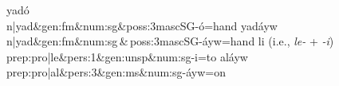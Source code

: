 \begin{description}
\begin{exe}
\ex \label{ex:prosuf-3ms}
{\selectfont \small
yad\'{o} \\
n|yad\&gen:fm\&num:sg\&poss:3mascSG-\'{o}=hand
}
\ex \label{ex:prosuf-3mpl}
{\selectfont \small
yad\'{a}yw \\
n|yad\&gen:fm\&num:sg\,\&\,poss:3mascSG-\'{a}yw=hand
}
\ex \label{ex:prep-pro-to}
{\selectfont \small
li \qquad \textrm{(i.e., \textit{le-} + \textit{-i})} \\
prep:pro|le\&pers:1\&gen:unsp\&num:sg-i=to
}
\ex \label{ex:prep-pro-on}
{\selectfont \small
{}al\'{a}yw  \\
prep:pro|al\&pers:3\&gen:ms\&num:sg-\'{a}yw=on
}
\end{exe}


\end{description}
